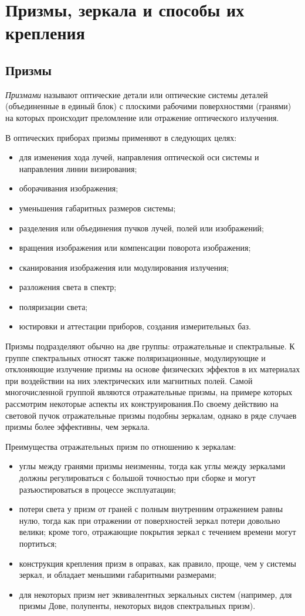 \chapter{Призмы, зеркала и способы их крепления}
\section{Призмы}

\textit{Призмами} называют оптические детали или оптические системы деталей (объединенные в единый блок) с плоскими рабочими поверхностями (гранями) на которых происходит преломление или отражение оптического излучения.

В оптических приборах призмы применяют в следующих целях:
\begin{itemize}
\item для изменения хода лучей, направления оптической оси системы и направления линии визирования;
\item оборачивания изображения;
\item уменьшения габаритных размеров системы;
\item разделения или объединения пучков лучей, полей или изображений;
\item вращения  изображения  или  компенсации  поворота изображения;
\item сканирования изображения или модулирования излучения;
\item разложения света в спектр;
\item поляризации света;
\item юстировки и аттестации приборов, создания измерительных баз.
\end{itemize}

Призмы подразделяют обычно на две группы: отражательные и спектральные. К группе спектральных относят также поляризационные, модулирующие и отклоняющие излучение призмы на основе физических эффектов в их материалах при воздействии на них электрических или магнитных полей.
Самой многочисленной группой являются отражательные призмы, на примере которых рассмотрим некоторые аспекты их конструирования.По своему действию на световой пучок отражательные призмы подобны зеркалам, однако в ряде случаев призмы более эффективны, чем зеркала.

Преимущества отражательных призм по отношению к зеркалам:
\begin{itemize}
\item углы между гранями призмы неизменны, тогда как углы между зеркалами должны регулироваться с большой точностью при сборке и могут разъюстироваться в процессе эксплуатации;
\item потери света у призм от граней с полным внутренним отражением равны нулю, тогда как при отражении от поверхностей зеркал потери довольно велики; кроме того, отражающие покрытия зеркал с течением времени могут портиться;
\item конструкция крепления призм в оправах, как правило, проще, чем у системы зеркал, и обладает меньшими габаритными размерами;
\item для некоторых призм нет эквивалентных зеркальных систем (например, для призмы Дове, полупенты, некоторых видов спектральных призм).
\end{itemize}
 
